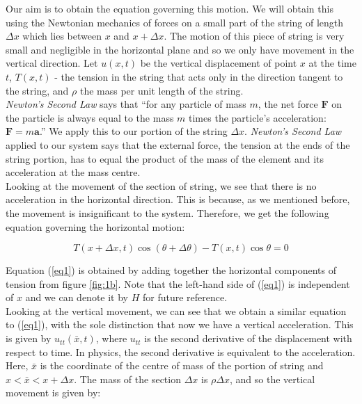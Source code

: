 \documentclass[a4paper, 12pt]{article}
\numberwithin{equation}{section}
\begin{document}
Our aim is to obtain the equation governing this motion. We will obtain this using the Newtonian
mechanics of forces on a small part of the string of length $\Delta x$ which lies between $x$ and 
$x+\Delta x$. The motion of this piece of string is very small and negligible in the horizontal plane
and so we only have movement
in the vertical direction. \cite{Kr} Let $u(x,t)$ be the vertical displacement of point $x$ at the time $t$, 
$T(x,t)$ - the tension in the string that acts only in the direction tangent to the string, and $\rho$ the 
mass per unit length of the string. 
\\

\emph{Newton's Second Law} says that ``for any particle of mass $m$, the net force 
$\boldsymbol{F}$ on the particle is always equal to the mass $m$ times the particle's 
acceleration: $\boldsymbol{F} = m \boldsymbol{a}$.'' \cite{Tay} We apply this to our 
portion of the string $\Delta x$. \emph{Newton's Second Law} applied to our system says that the external
force, the tension at the ends of the string portion, has to equal the product of the mass of the element and 
its acceleration at the mass centre. 
\\

Looking at the movement of the section of string, we see that there is no acceleration in the horizontal direction. 
This is because, as we mentioned before, the movement is insignificant to the system. Therefore, we get the 
following equation governing the horizontal motion:

\begin {equation} \label{eq1}
    T(x+\Delta x,t)\cos{(\theta + \Delta \theta)}-T(x,t)\cos{\theta}=0
\end {equation}

Equation (\ref{eq1}) is obtained by adding together the horizontal components of tension from figure \ref{fig:1b}. Note that the left-hand
side of (\ref{eq1}) is independent of $x$ and we can denote it by $H$ for future reference.
\\

Looking at the vertical movement, we can see that we obtain a similar equation to (\ref{eq1}), with the sole distinction
that now we have a vertical acceleration. This is given by $u_{tt} (\bar{x},t)$, where $u_{tt}$ is the second derivative
of the displacement with respect to time. In physics, the second derivative is equivalent to the acceleration. Here,
 $\bar{x}$ is the coordinate of the centre of mass of the portion of string and $x<\bar{x}<x+\Delta x$. The mass of the 
 section $\Delta x$ is $\rho\Delta x$, and so the vertical movement is given by:
\end{document}
